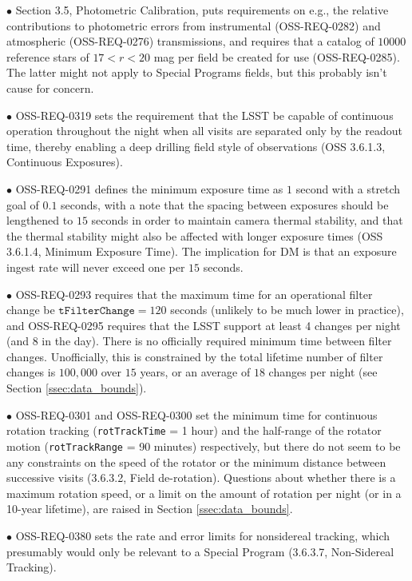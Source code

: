 $\bullet$ Section 3.5, Photometric Calibration, puts requirements on e.g., the relative contributions to photometric errors from instrumental (OSS-REQ-0282) and atmospheric (OSS-REQ-0276) transmissions, and requires that a catalog of $10000$ reference stars of $17<r<20$ mag per field be created for use (OSS-REQ-0285). The latter might not apply to Special Programs fields, but this probably isn't cause for concern.

$\bullet$ OSS-REQ-0319 sets the requirement that the LSST be capable of continuous operation throughout the night when all visits are separated only by the readout time, thereby enabling a deep drilling field style of observations (OSS 3.6.1.3, Continuous Exposures).

$\bullet$ OSS-REQ-0291 defines the minimum exposure time as $1$ second with a stretch goal of $0.1$ seconds, with a note that the spacing between exposures should be lengthened to $15$ seconds in order to maintain camera thermal stability, and that the thermal stability might also be affected with longer exposure times (OSS 3.6.1.4, Minimum Exposure Time). The implication for DM is that an exposure ingest rate will never exceed one per $15$ seconds.

$\bullet$ OSS-REQ-0293 requires that the maximum time for an operational filter change be $\texttt{tFilterChange} = 120$ seconds (unlikely to be much lower in practice), and OSS-REQ-0295 requires that the LSST support at least 4 changes per night (and 8 in the day). There is no officially required minimum time between filter changes. Unofficially, this is constrained by the total lifetime number of filter changes is $100,000$ over $15$ years, or an average of $18$ changes per night (see Section \ref{ssec:data_bounds}).

$\bullet$ OSS-REQ-0301 and OSS-REQ-0300 set the minimum time for continuous rotation tracking (\texttt{rotTrackTime} = 1 hour) and the half-range of the rotator motion (\texttt{rotTrackRange} = 90 minutes) respectively, but there do not seem to be any constraints on the speed of the rotator or the minimum distance between successive visits (3.6.3.2, Field de-rotation). Questions about whether there is a maximum rotation speed, or a limit on the amount of rotation per night (or in a 10-year lifetime), are raised in Section \ref{ssec:data_bounds}.

$\bullet$ OSS-REQ-0380 sets the rate and error limits for nonsidereal tracking, which presumably would only be relevant to a Special Program (3.6.3.7, Non-Sidereal Tracking).


